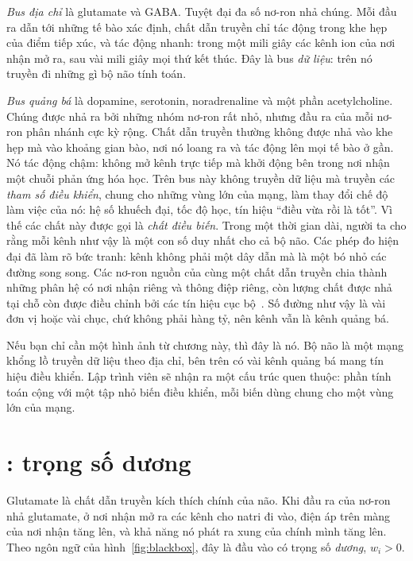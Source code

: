 \emph{Bus địa chỉ} là glutamate và GABA. Tuyệt đại đa số nơ-ron nhả chúng. Mỗi đầu ra dẫn tới những tế bào xác định, chất dẫn truyền chỉ tác động trong khe hẹp của điểm tiếp xúc, và tác động nhanh: trong một mili giây các kênh ion của nơi nhận mở ra, sau vài mili giây mọi thứ kết thúc. Đây là bus \emph{dữ liệu}: trên nó truyền đi những gì bộ não tính toán.

\emph{Bus quảng bá} là dopamine, serotonin, noradrenaline và một phần acetylcholine. Chúng được nhả ra bởi những nhóm nơ-ron rất nhỏ, nhưng đầu ra của mỗi nơ-ron phân nhánh cực kỳ rộng. Chất dẫn truyền thường không được nhả vào khe hẹp mà vào khoảng gian bào, nơi nó loang ra và tác động lên mọi tế bào ở gần. Nó tác động chậm: không mở kênh trực tiếp mà khởi động bên trong nơi nhận một chuỗi phản ứng hóa học. Trên bus này không truyền dữ liệu mà truyền các \emph{tham số điều khiển}, chung cho những vùng lớn của mạng, làm thay đổi chế độ làm việc của nó: hệ số khuếch đại, tốc độ học, tín hiệu ``điều vừa rồi là tốt''. Vì thế các chất này được gọi là \emph{chất điều biến}. Trong một thời gian dài, người ta cho rằng mỗi kênh như vậy là một con số duy nhất cho cả bộ não. Các phép đo hiện đại đã làm rõ bức tranh: kênh không phải một dây dẫn mà là một bó nhỏ các đường song song. Các nơ-ron nguồn của cùng một chất dẫn truyền chia thành những phân hệ có nơi nhận riêng và thông điệp riêng, còn lượng chất được nhả tại chỗ còn được điều chỉnh bởi các tín hiệu cục bộ~\cite{Ren2018,Poe2020}. Số đường như vậy là vài đơn vị hoặc vài chục, chứ không phải hàng tỷ, nên kênh vẫn là kênh quảng bá.

Nếu bạn chỉ cần một hình ảnh từ chương này, thì đây là nó. Bộ não là một mạng khổng lồ truyền dữ liệu theo địa chỉ, bên trên có vài kênh quảng bá mang tín hiệu điều khiển. Lập trình viên sẽ nhận ra một cấu trúc quen thuộc: phần tính toán cộng với một tập nhỏ biến điều khiển, mỗi biến dùng chung cho một vùng lớn của mạng.

\section{: trọng số dương}

Glutamate là chất dẫn truyền kích thích chính của não. Khi đầu ra của nơ-ron nhả glutamate, ở nơi nhận mở ra các kênh cho natri đi vào, điện áp trên màng của nơi nhận tăng lên, và khả năng nó phát ra xung của chính mình tăng lên. Theo ngôn ngữ của hình~\ref{fig:blackbox}, đây là đầu vào có trọng số \emph{dương}, $w_i>0$.

